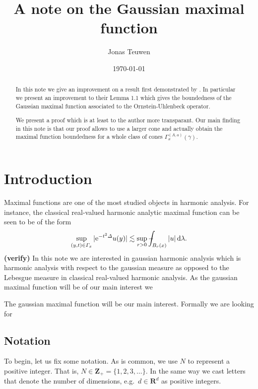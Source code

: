 \documentclass[a4paper,oneside,10pt]{amsproc}
\title[Gaussian maximal functions]{A note on the Gaussian maximal function}
\author{Jonas Teuwen}%
\date{\today}
\theoremstyle{plain}
\theoremstyle{remark}
\theoremstyle{definition}
\newcommand{\D}{\,\textup{d}}
\def\Xint#1{\mathchoice
  {\XXint\displaystyle\textstyle{#1}}%
  {\XXint\textstyle\scriptstyle{#1}}%
  {\XXint\scriptstyle\scriptscriptstyle{#1}}%
  {\XXint\scriptscriptstyle\scriptscriptstyle{#1}}%
  \!\int}
\def\XXint#1#2#3{{\setbox0=\hbox{$#1{#2#3}{\int}$ }
    \vcenter{\hbox{$#2#3$ }}\kern-.535\wd0}}
\def\dashint{\Xint-}
\newcommand{\R}{\mathbf R}
\newcommand{\Z}{\mathbf Z}
\newcommand{\e}{\mathrm{e}} %
\begin{document}
\begin{abstract}
  In this note we give an improvement on a result first demonstrated
  by \textcite{Pineda2008}. In particular we present an improvement to
  their Lemma 1.1 which gives the boundedness of the
  Gaussian maximal function associated to the Ornstein-Uhlenbeck
  operator.

  We present a proof which is at least to the author more transparant.
  Our main finding in this note is that our proof allows to use a
  larger cone and actually obtain the maximal function boundedness for
  a whole class of cones $\Gamma^{(A, a)}_x(\gamma)$.
\end{abstract}


\maketitle
\section{Introduction}
Maximal functions are one of the most studied objects in harmonic
analysis. 
For instance, the classical real-valued harmonic analytic maximal
function can be seen to be of the form
\begin{equation*}
  \sup_{(y, t) \in \Gamma_x} |\e^{-t^2 \Delta} u(y)| \lesssim \sup_{r
    > 0}  \dashint_{B_r(x)} |u| \D\lambda.
\end{equation*}
\textbf{(verify)}
In this note we are interested in gaussian harmonic analysis
which is harmonic analysis with respect to the gaussian measure as
opposed to the Lebesgue measure in classical real-valued harmonic
analysis. As the gaussian maximal function will be of our main
interest we 

The gaussian maximal function will be our main interest.
Formally we are looking for 

\textcite{Pineda2008}

\subsection{Notation}
To begin, let us fix some notation. As is common, we use $N$ to
represent a positive integer. That is, $N \in \Z_+ = \{1, 2, 3,
\dots\}$. In the same way we cast letters that denote the number of
dimensions, e.g.\ $d \in \R^d$ as positive integers.
\end{document}

